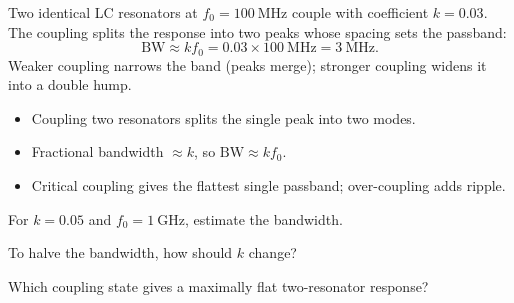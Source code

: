 \begin{workedexample}
Two identical LC resonators at $f_0 = 100\ \text{MHz}$ couple with
coefficient $k = 0.03$. The coupling splits the response into two peaks whose
spacing sets the passband:
\[ \text{BW} \approx k f_0 = 0.03\times100\ \text{MHz} = 3\ \text{MHz}. \]
Weaker coupling narrows the band (peaks merge); stronger coupling widens it into
a double hump.
\end{workedexample}

\begin{keytakeaways}
\begin{itemize}[leftmargin=1.4em,itemsep=2pt]
\item Coupling two resonators splits the single peak into two modes.
\item Fractional bandwidth $\approx k$, so $\text{BW} \approx k f_0$.
\item Critical coupling gives the flattest single passband; over-coupling adds ripple.
\end{itemize}
\end{keytakeaways}

\begin{exercises}
\item For $k = 0.05$ and $f_0 = 1\ \text{GHz}$, estimate the bandwidth.
\item To halve the bandwidth, how should $k$ change?
\item Which coupling state gives a maximally flat two-resonator response?
\end{exercises}


